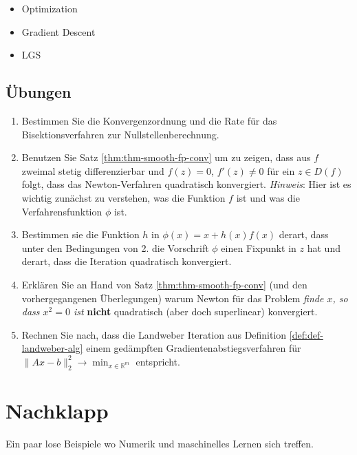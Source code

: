 \documentclass[
]{book}
\providecommand{\tightlist}{%
  \setlength{\itemsep}{0pt}\setlength{\parskip}{0pt}}
\theoremstyle{definition}
\theoremstyle{definition}
\theoremstyle{definition}
\theoremstyle{definition}
\theoremstyle{remark}
\begin{document}
\begin{itemize}
\tightlist
\item
  Optimization
\item
  Gradient Descent
\item
  LGS
\end{itemize}

\hypertarget{uxfcbungen-2}{%
\section{Übungen}\label{uxfcbungen-2}}

\begin{enumerate}
\def\labelenumi{\arabic{enumi}.}
\item
  Bestimmen Sie die Konvergenzordnung und die Rate für das Bisektionsverfahren zur Nullstellenberechnung.
\item
  Benutzen Sie Satz \ref{thm:thm-smooth-fp-conv} um zu zeigen, dass aus \(f\) zweimal stetig differenzierbar und \(f(z)=0\), \(f'(z)\neq 0\) für ein \(z\in D(f)\) folgt, dass das Newton-Verfahren quadratisch konvergiert. \emph{Hinweis}: Hier ist es wichtig zunächst zu verstehen, was die Funktion \(f\) ist und was die Verfahrensfunktion \(\phi\) ist.
\item
  Bestimmen sie die Funktion \(h\) in \(\phi(x) = x+h(x)f(x)\) derart, dass unter den Bedingungen von 2. die Vorschrift \(\phi\) einen Fixpunkt in \(z\) hat und derart, dass die Iteration quadratisch konvergiert.
\item
  Erklären Sie an Hand von Satz \ref{thm:thm-smooth-fp-conv} (und den vorhergegangenen Überlegungen) warum Newton für das Problem \emph{finde \(x\), so dass \(x^2=0\) ist} \textbf{nicht} quadratisch (aber doch superlinear) konvergiert.
\item
  Rechnen Sie nach, dass die Landweber Iteration aus Definition \ref{def:def-landweber-alg} einem gedämpften Gradientenabstiegsverfahren für \(\|Ax-b\|_2^2 \to \min_{x\in \mathbb R^{m}}\) entspricht.
\end{enumerate}

\hypertarget{nachklapp}{%
\chapter{Nachklapp}\label{nachklapp}}

Ein paar lose Beispiele wo Numerik und maschinelles Lernen sich treffen.
\end{document}
